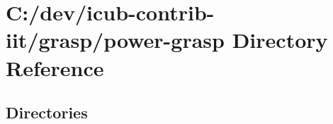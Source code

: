 \section{C\+:/dev/icub-\/contrib-\/iit/grasp/power-\/grasp Directory Reference}
\label{dir_0ad8189661b789e2c81eb706a3577fbb}
\subsection*{Directories}
\begin{DoxyCompactItemize}
\end{DoxyCompactItemize}

